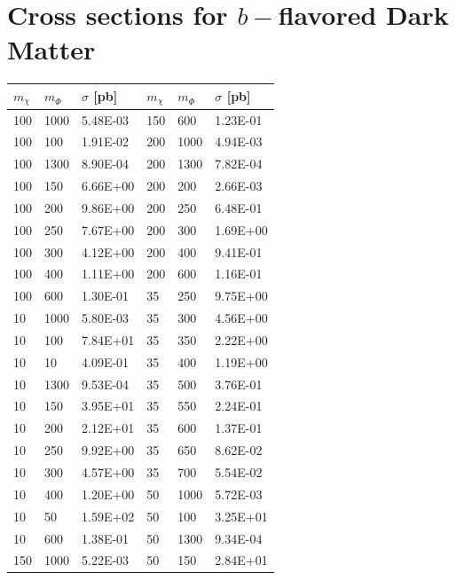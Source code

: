 \section{Cross sections for $b-$flavored Dark Matter}
\label{app:xsecs_bFDM}

\begin{table}[h]
	\centering
	\begin{tabular}{lll|lll}
		\hline \hline
		$m_\chi $  & $m_\Phi$ & $\sigma$ [pb] & $m_\chi $  & $m_\Phi$ & $\sigma$ [pb]\\ \hline \hline
		100 & 1000 & 5.48E-03 & 150 & 600  & 1.23E-01 \\\hline
		100 & 100  & 1.91E-02 & 200 & 1000 & 4.94E-03 \\\hline
		100 & 1300 & 8.90E-04 & 200 & 1300 & 7.82E-04 \\\hline
		100 & 150  & 6.66E+00 & 200 & 200  & 2.66E-03 \\\hline
		100 & 200  & 9.86E+00 & 200 & 250  & 6.48E-01 \\\hline
		100 & 250  & 7.67E+00 & 200 & 300  & 1.69E+00 \\\hline
		100 & 300  & 4.12E+00 & 200 & 400  & 9.41E-01 \\\hline
		100 & 400  & 1.11E+00 & 200 & 600  & 1.16E-01 \\\hline
		100 & 600  & 1.30E-01 & 35  & 250  & 9.75E+00 \\\hline
		10  & 1000 & 5.80E-03 & 35  & 300  & 4.56E+00 \\\hline
		10  & 100  & 7.84E+01 & 35  & 350  & 2.22E+00 \\\hline
		10  & 10   & 4.09E-01 & 35  & 400  & 1.19E+00 \\\hline
		10  & 1300 & 9.53E-04 & 35  & 500  & 3.76E-01 \\\hline
		10  & 150  & 3.95E+01 & 35  & 550  & 2.24E-01 \\\hline
		10  & 200  & 2.12E+01 & 35  & 600  & 1.37E-01 \\\hline
		10  & 250  & 9.92E+00 & 35  & 650  & 8.62E-02 \\\hline
		10  & 300  & 4.57E+00 & 35  & 700  & 5.54E-02 \\\hline
		10  & 400  & 1.20E+00 & 50  & 1000 & 5.72E-03 \\\hline
		10  & 50   & 1.59E+02 & 50  & 100  & 3.25E+01 \\\hline
		10  & 600  & 1.38E-01 & 50  & 1300 & 9.34E-04 \\\hline
		150 & 1000 & 5.22E-03 & 50  & 150  & 2.84E+01 \\\hline

\end{tabular}
\end{table}
